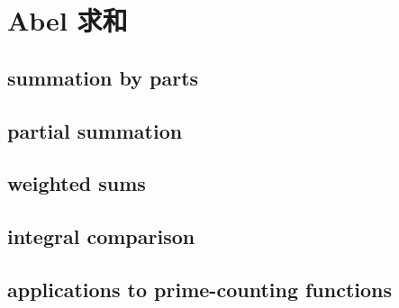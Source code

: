 \section{Abel 求和}
\label{b3:sec:2503}


\subsection{summation by parts}
\label{b3:subsec:250301}

\subsection{partial summation}
\label{b3:subsec:250302}

\subsection{weighted sums}
\label{b3:subsec:250303}

\subsection{integral comparison}
\label{b3:subsec:250304}

\subsection{applications to prime-counting functions}
\label{b3:subsec:250305}



